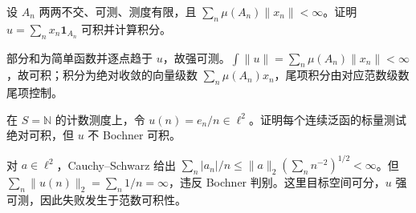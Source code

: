 \begin{exercise}[积分与求和]\label{ex:y5-series}
设 $A_n$ 两两不交、可测、测度有限，且 $\sum_n\mu(A_n)\|x_n\|<\infty$。证明 $u=\sum_nx_n\mathbf1_{A_n}$ 可积并计算积分。
\end{exercise}
\begin{solution}
部分和为简单函数并逐点趋于 $u$，故强可测。$\int\|u\|=\sum_n\mu(A_n)\|x_n\|<\infty$，故可积；积分为绝对收敛的向量级数 $\sum_n\mu(A_n)x_n$，尾项积分由对应范数级数尾项控制。
\end{solution}

\begin{exercise}[所有标量测试可积仍不足]\label{ex:y5-scalarly-integrable}
在 $S=\mathbb N$ 的计数测度上，令 $u(n)=e_n/n\in\ell^2$。证明每个连续泛函的标量测试绝对可积，但 $u$ 不 Bochner 可积。
\end{exercise}
\begin{solution}
对 $a\in\ell^2$，Cauchy--Schwarz 给出 $\sum_n|a_n|/n\le\|a\|_2(\sum_n n^{-2})^{1/2}<\infty$。但 $\sum_n\|u(n)\|_2=\sum_n1/n=\infty$，违反 Bochner 判别。这里目标空间可分，$u$ 强可测，因此失败发生于范数可积性。
\end{solution}
